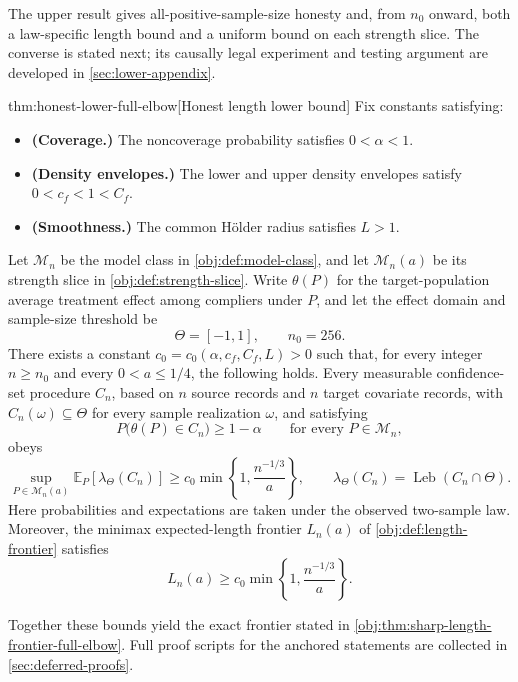The upper result gives all-positive-sample-size honesty and, from \(n_0\) onward, both a law-specific length bound and a uniform bound on each strength slice. The converse is stated next; its causally legal experiment and testing argument are developed in \cref{sec:lower-appendix}.

\begin{theoremv}{thm:honest-lower-full-elbow}[Honest length lower bound]
Fix constants satisfying:
\begin{itemize}
\item \textbf{(Coverage.)} The noncoverage probability satisfies \(0<\alpha<1\).
\item \textbf{(Density envelopes.)} The lower and upper density envelopes satisfy \(0<c_f<1<C_f\).
\item \textbf{(Smoothness.)} The common Hölder radius satisfies \(L>1\).
\end{itemize}
Let \(\mathcal M_n\) be the model class in \cref{obj:def:model-class}, and let \(\mathcal M_n(a)\) be its strength slice in \cref{obj:def:strength-slice}. Write \(\theta(P)\) for the target-population average treatment effect among compliers under \(P\), and let the effect domain and sample-size threshold be
\[
\Theta=[-1,1],
\qquad n_0=256.
\]
There exists a constant \(c_0=c_0(\alpha,c_f,C_f,L)>0\) such that, for every integer \(n\ge n_0\) and every \(0<a\le 1/4\), the following holds. Every measurable confidence-set procedure \(C_n\), based on \(n\) source records and \(n\) target covariate records, with \(C_n(\omega)\subseteq\Theta\) for every sample realization \(\omega\), and satisfying
\[
P\bigl(\theta(P)\in C_n\bigr)\ge 1-\alpha
\qquad\text{for every }P\in\mathcal M_n,
\]
obeys
\[
\sup_{P\in\mathcal M_n(a)}
\mathbb E_P\!\left[\lambda_{\Theta}(C_n)\right]
\ge c_0\min\left\{1,\frac{n^{-1/3}}{a}\right\},
\qquad
\lambda_{\Theta}(C_n)
=\operatorname{Leb}(C_n\cap\Theta).
\]
Here probabilities and expectations are taken under the observed two-sample law. Moreover, the minimax expected-length frontier \(L_n(a)\) of \cref{obj:def:length-frontier} satisfies
\[
L_n(a)\ge c_0\min\left\{1,\frac{n^{-1/3}}{a}\right\}.
\]
\end{theoremv}

Together these bounds yield the exact frontier stated in \cref{obj:thm:sharp-length-frontier-full-elbow}. Full proof scripts for the anchored statements are collected in \cref{sec:deferred-proofs}.
